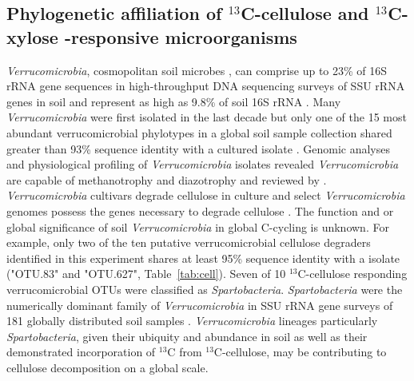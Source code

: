 \subsection{Phylogenetic affiliation of $^{13}$C-cellulose and $^{13}$C-xylose
    -responsive microorganisms}
\textit{Verrucomicrobia}, cosmopolitan soil microbes
\citep{Bergmann_2011}, can comprise up to 23\% of 16S rRNA gene sequences in
high-throughput DNA sequencing surveys of SSU rRNA genes in soil
\citep{Bergmann_2011} and represent as high as 9.8\% of soil 16S rRNA
\citep{Buckley_2001}. Many \textit{Verrucomicrobia} were first isolated in the
last decade \cite{Wertz_2011} but only one of the 15 most abundant
verrucomicrobial phylotypes in a global soil sample collection shared greater
than 93\% sequence identity with a cultured isolate \citep{Bergmann_2011}.
Genomic analyses and physiological profiling of \textit{Verrucomicrobia}
isolates revealed \textit{Verrucomicrobia} are capable of methanotrophy and
diazotrophy \citep{Wertz_2011} and reviewed by \citet{Wertz_2011}.
\textit{Verrucomicrobia} cultivars degrade cellulose in culture and select
\textit{Verrucomicrobia} genomes possess the genes necessary to degrade
cellulose \citep{Otsuka_2012, Wertz_2011}.  The function and or global
significance of soil \textit{Verrucomicrobia} in global C-cycling is unknown.
For example, only two of the ten putative verrucomicrobial cellulose degraders
identified in this experiment shares at least 95\% sequence identity with
a isolate ("OTU.83" and "OTU.627", Table~\ref{tab:cell}). Seven of 10
$^{13}$C-cellulose responding verrucomicrobial OTUs were classified as
\textit{Spartobacteria}. \textit{Spartobacteria} were the numerically dominant
family of \textit{Verrucomicrobia} in SSU rRNA gene surveys of 181 globally
distributed soil samples \citep{Bergmann_2011}. \textit{Verrucomicrobia}
lineages particularly \textit{Spartobacteria}, given their ubiquity and
abundance in soil as well as their demonstrated incorporation of $^{13}$C from
$^{13}$C-cellulose, may be contributing to cellulose decomposition on a global
scale.

